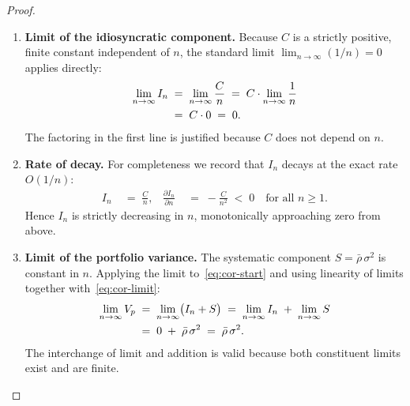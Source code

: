 \documentclass[12pt,openany]{book}
\numberwithin{equation}{chapter}
\theoremstyle{plain}
\theoremstyle{definition}
\theoremstyle{remark}
\begin{document}
\begin{proof}
\begin{enumerate}
  \item \textbf{Limit of the idiosyncratic component.}
        Because $C$ is a strictly positive, finite constant
        independent of $n$, the standard limit
        $\lim_{n\to\infty}(1/n) = 0$ applies directly:
        \begin{align}
          \lim_{n \to \infty} I_n
          &\;=\;
            \lim_{n \to \infty} \frac{C}{n}
          \;=\;
            C \cdot \lim_{n \to \infty} \frac{1}{n}
          \notag \\
          &\;=\;
            C \cdot 0
          \;=\;
            0.
          \label{eq:cor-limit}
        \end{align}
        The factoring in the first line is justified because
        $C$ does not depend on $n$.

  \item \textbf{Rate of decay.}
        For completeness we record that $I_n$ decays at the
        exact rate $O(1/n)$:
        \begin{align}
          I_n
          &\;=\;
            \frac{C}{n},
          &
          \frac{\partial I_n}{\partial n}
          &\;=\;
            -\frac{C}{n^2}
          \;<\; 0
          \quad \text{for all } n \geq 1.
          \label{eq:cor-rate}
        \end{align}
        Hence $I_n$ is strictly decreasing in $n$, monotonically
        approaching zero from above.

  \item \textbf{Limit of the portfolio variance.}
        The systematic component $S = \bar{\rho}\,\sigma^2$ is
        constant in $n$.  Applying the limit to~\eqref{eq:cor-start}
        and using linearity of limits together
        with~\eqref{eq:cor-limit}:
        \begin{align}
          \lim_{n \to \infty} V_p
          &\;=\;
            \lim_{n \to \infty}
            \bigl(I_n + S\bigr)
          \;=\;
            \lim_{n \to \infty} I_n
            \;+\;
            \lim_{n \to \infty} S
          \notag \\
          &\;=\;
            0
            \;+\;
            \bar{\rho}\,\sigma^2
          \;=\;
            \bar{\rho}\,\sigma^2.
          \label{eq:cor-result}
        \end{align}
        The interchange of limit and addition is valid because both
        constituent limits exist and are finite.


\end{enumerate}
\end{proof}
\end{document}
